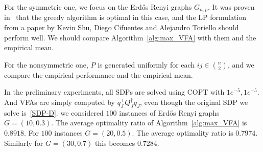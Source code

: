 \documentclass[10pt,leqno]{amsart}
\begin{document}
For the symmetric one, we focus on the Erd\H{o}s Renyi  graphs $G_{n,p}$.
It was proven in~\cite{DNP} that the greedy algorithm is optimal in this case, and the LP formulation from a paper by Kevin Shu, Diego Cifuentes and Alejandro Toriello should perform well.
We should compare Algorithm~\eqref{alg:max_VFA} with them and the empirical mean.

For the nonsymmetric one, $P$ is generated uniformly for each $ij\in {n\choose{2}}$, and we compare the empirical performance and the empirical mean.

In the preliminary experiments, all SDPs are solved using COPT with $1e^{-5},1e^{-5}$. And VFAs are simply computed by $q_J^\top Q_J^\dagger q_J$, even though the original SDP we solve is~\eqref{SDP-D}.
we considered $100$ instances of Erd\H{o}s Renyi graphs $G=(10,0.3)$.
The average optimality ratio of Algorithm~\eqref{alg:max_VFA} is {\color{red}$0.8918$}.
For $100$ instances $G=(20,0.5)$.
The average optimality ratio is {\color{red}$0.7974$}.
Similarly for $G=(30,0.7)$ this becomes $0.7284$.
\end{document}

